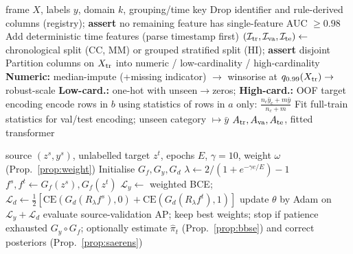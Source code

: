 \documentclass[journal]{IEEEtran}
\newcommand{\1}{\mathbf{1}}
\begin{document}
\begin{algorithm}[t]
\caption{Leakage-free preprocessing (\texttt{splits.py}, \texttt{preprocess.py}, \texttt{leakage.py})}\label{alg:prep}
\begin{algorithmic}[1]
\Require frame $X$, labels $y$, domain $k$, grouping/time key
\State Drop identifier and rule-derived columns (registry); \textbf{assert} no remaining feature has single-feature AUC $\ge0.98$
\State Add deterministic time features (parse timestamp first)
\State $(\mathcal I_{\rm tr},\mathcal I_{\rm va},\mathcal I_{\rm te})\gets$ chronological split (CC, MM) or grouped stratified split (HI); \textbf{assert} disjoint
\State Partition columns on $X_{\rm tr}$ into numeric / low-cardinality / high-cardinality
\State \textbf{Numeric:} median-impute (+missing indicator) $\to$ winsorise at $q_{0.99}(X_{\rm tr})\to$ robust-scale
\State \textbf{Low-card.:} one-hot with unseen$\to$zeros; \textbf{High-card.:} OOF target encoding
  \State encode rows in $b$ using statistics of rows in $a$ only: $\frac{n_c\bar y_c+m\bar y}{n_c+m}$
\EndFor
\State Fit full-train statistics for val/test encoding; unseen category $\mapsto\bar y$
\State \Return $A_{\rm tr},A_{\rm va},A_{\rm te}$, fitted transformer
\end{algorithmic}
\end{algorithm}

\begin{algorithm}[t]
\caption{DANN with prior-corrected weighting}\label{alg:dann}
\begin{algorithmic}[1]
\Require source $(z^s,y^s)$, unlabelled target $z^t$, epochs $E$, $\gamma=10$, weight $\omega$ (Prop.~\ref{prop:weight})
\State Initialise $G_f,G_y,G_d$
  \State $\lambda\gets 2/(1+e^{-\gamma e/E})-1$ 
    \State $f^s,f^t\gets G_f(z^s),G_f(z^t)$
    \State $\mathcal L_y\gets$ weighted BCE; $\mathcal L_d\gets\tfrac12[\mathrm{CE}(G_d(R_\lambda f^s),0)+\mathrm{CE}(G_d(R_\lambda f^t),1)]$
    \State update $\theta$ by Adam on $\mathcal L_y+\mathcal L_d$ 
  \EndFor
  \State evaluate source-validation AP; keep best weights; stop if patience exhausted
\EndFor
\State \Return $G_y\!\circ\!G_f$; optionally estimate $\hat\pi_t$ (Prop.~\ref{prop:bbse}) and correct posteriors (Prop.~\ref{prop:saerens})
\end{algorithmic}
\end{algorithm}
\end{document}
